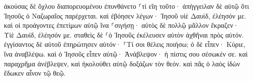 \documentclass{openreader}
\begin{document}
ἀκούσας δὲ ὄχλου διαπορευομένου ἐπυνθάνετο ⸀τί εἴη τοῦτο· 
ἀπήγγειλαν δὲ αὐτῷ ὅτι Ἰησοῦς ὁ Ναζωραῖος παρέρχεται. 
καὶ ἐβόησεν λέγων· Ἰησοῦ υἱὲ Δαυίδ, ἐλέησόν με. 
καὶ οἱ προάγοντες ἐπετίμων αὐτῷ ἵνα ⸀σιγήσῃ· αὐτὸς δὲ πολλῷ μᾶλλον ἔκραζεν· Υἱὲ Δαυίδ, ἐλέησόν με. 
σταθεὶς δὲ ⸀ὁ Ἰησοῦς ἐκέλευσεν αὐτὸν ἀχθῆναι πρὸς αὐτόν. ἐγγίσαντος δὲ αὐτοῦ ἐπηρώτησεν αὐτόν· 
⸀Τί σοι θέλεις ποιήσω; ὁ δὲ εἶπεν· Κύριε, ἵνα ἀναβλέψω. 
καὶ ὁ Ἰησοῦς εἶπεν αὐτῷ· Ἀνάβλεψον· ἡ πίστις σου σέσωκέν σε. 
καὶ παραχρῆμα ἀνέβλεψεν, καὶ ἠκολούθει αὐτῷ δοξάζων τὸν θεόν. καὶ πᾶς ὁ λαὸς ἰδὼν ἔδωκεν αἶνον τῷ θεῷ. 
\end{document}
